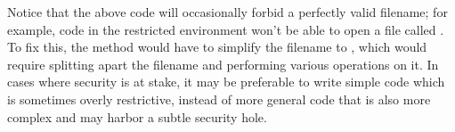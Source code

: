 Notice that the above code will occasionally forbid a perfectly valid
filename; for example, code in the restricted environment won't be
able to open a file called .  To fix this, the
 method would have to simplify the filename to
, which would require splitting apart the filename and
performing various operations on it.  In cases where security is at
stake, it may be preferable to write simple code which is sometimes
overly restrictive, instead of more general code that is also more
complex and may harbor a subtle security hole.
